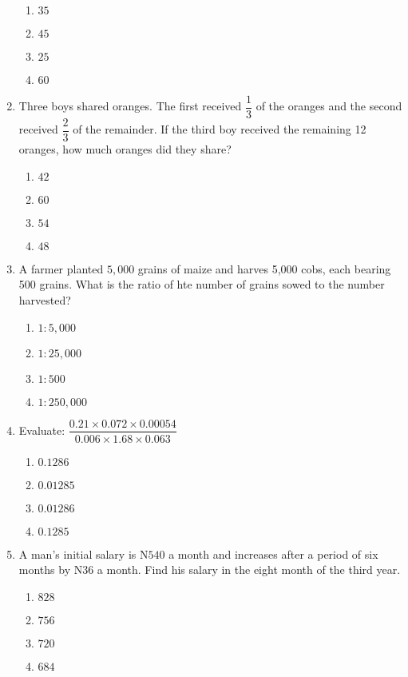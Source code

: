 \begin{multicols}{2}
\begin{enumerate}[label={\arabic*.}]
    \begin{enumerate}[label={\Alph*.}]
    \item \(35\)
    \item \(45\)
    \item \(25\)
    \item \(60\)
    \end{enumerate}
\item Three boys shared oranges. The first received \(\dfrac{1}{3}\) of the oranges and the second received \(\dfrac{2}{3}\)
of the remainder. If the third boy received the remaining 12 oranges, how much oranges did they share?
    \begin{enumerate}[label={\Alph*.}]
    \item \(42\)
    \item \(60\)
    \item \(54\)
    \item \(48\)
    \end{enumerate}
\item A farmer planted \(5,000\) grains of maize and harves 5,000 cobs, each bearing 500 grains. What is the ratio of hte number of grains sowed 
to the number harvested? 
    \begin{enumerate}[label={\Alph*.}]
    \item \(1:5,000\)
    \item \(1:25,000\)
    \item \(1:500\)
    \item \(1:250,000\)
    \end{enumerate}
\item Evaluate: \(\dfrac{0.21 \times 0.072 \times 0.00054}{0.006 \times 1.68 \times 0.063}\)
    \begin{enumerate}[label={\Alph*.}]
    \item \(0.1286\)
    \item \(0.01285\)
    \item \(0.01286\)
    \item \(0.1285\)
    \end{enumerate}
\item A man's initial salary is N\(540\) a month and increases after a period of six months by N36 a
month. Find his salary in the eight month of the third year. 
    \begin{enumerate}[label={\Alph*.}]
    \item \(828\)
    \item \(756\)
    \item \(720\)
    \item \(684\)

\end{enumerate}
\end{enumerate}
\end{multicols}
